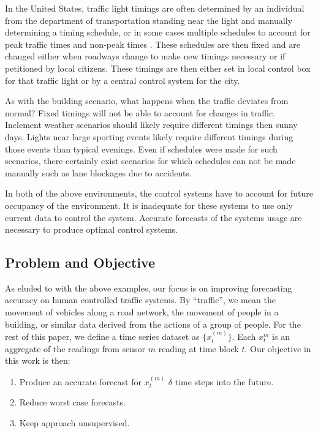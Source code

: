 In the United States, traffic light timings are often determined by an individual from the department of transportation standing near the light and manually determining a timing schedule, or in some cases multiple schedules to account for peak traffic times and non-peak times \cite{Koonce2008}.  These schedules are then fixed and are changed either when roadways change to make new timings necessary or if petitioned by local citizens.  These timings are then either set in local control box for that traffic light or by a central control system for the city.  

As with the building scenario, what happens when the traffic deviates from normal?  Fixed timings will not be able to account for changes in traffic.  Inclement weather scenarios should likely require different timings then sunny days.  Lights near large sporting events likely require different timings during those events than typical evenings.  Even if schedules were made for such scenarios, there certainly exist scenarios for which schedules can not be made manually such as lane blockages due to accidents. 

In both of the above environments, the control systems have to account for future occupancy of the environment.  It is inadequate for these systems to use only current data to control the system.  Accurate forecasts of the systems usage are necessary to produce optimal control systems.  

\subsection{Problem and Objective}
As eluded to with the above examples, our focus is on improving forecasting accuracy on human controlled traffic systems.  By “traffic”, we mean the movement of vehicles along a road network, the movement of people in a building, or similar data derived from the actions of a group of people.  For the rest of this paper, we define a time series dataset as $\{x_{t}^{(m)}\}$.  Each $x_{t}^{m}$ is an aggregate of the readings from sensor $m$ reading at time block $t$.  Our objective in this work is then:

\begin{enumerate}
	\item Produce an accurate forecast for $x_{t}^{(m)}$ $\delta$ time steps into the future.
	\item Reduce worst case forecasts.
	\item Keep approach unsupervised.
\end{enumerate}

